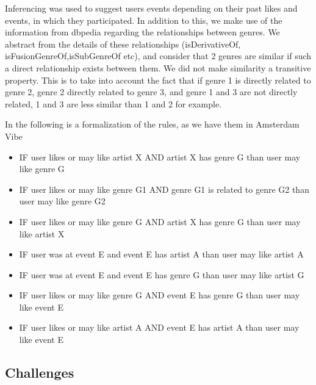 \documentclass[12pt, a4paper, lithuanian]{article}
\begin{document}
Inferencing was used to suggest users events depending on their past likes and events, in which they participated. In addition to this, we make use of the information from dbpedia regarding the relationships between genres. We abstract from the details of these relationships (isDerivativeOf, isFusionGenreOf,isSubGenreOf etc), and consider that 2 genres are similar if such a direct relationship exists between them. We did not make similarity a transitive property. This is to take into account the fact that if genre 1 is directly related to genre 2, genre 2 directly related to genre 3, and genre 1 and 3 are not directly related, 1 and 3 are less similar than 1 and 2 for example. 

In the following is a formalization of the rules, as we have them in Amsterdam Vibe

\begin{itemize}
  
    \item IF user likes or may like artist X AND artist X has genre G than user may like genre G

    \item IF user likes or may like genre G1 AND genre G1 is related to genre G2 than user may like genre G2

    \item IF user likes or may like genre G AND artist X has genre G than user may like artist X

    \item IF user was at event E and event E has artist A than user may like artist A
 
    \item IF user was at event E and event E has genre G than user may like artist G

    \item IF user likes or may like genre G AND event E has genre G than user may like event E

    \item IF user likes or may like artist A AND event E has artist A than user may like event E


\end{itemize}

\subsection{Challenges}
\end{document}

